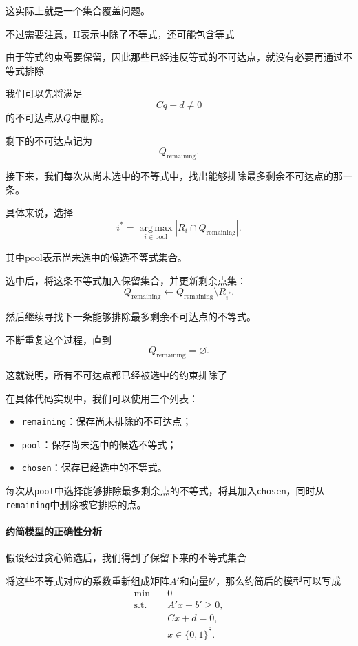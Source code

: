 这实际上就是一个集合覆盖问题。

不过需要注意，H表示中除了不等式，还可能包含等式

由于等式约束需要保留，因此那些已经违反等式的不可达点，就没有必要再通过不等式排除

我们可以先将满足
\[
Cq+d\ne0
\]
的不可达点从$Q$中删除。

剩下的不可达点记为
\[
Q_{\mathrm{remaining}}.
\]

接下来，我们每次从尚未选中的不等式中，找出能够排除最多剩余不可达点的那一条。

具体来说，选择
\[
i^*=\underset{i\in\mathrm{pool}}{\operatorname{arg\,max}}
\left|R_i\cap Q_{\mathrm{remaining}}\right|.
\]

其中$\mathrm{pool}$表示尚未选中的候选不等式集合。

选中后，将这条不等式加入保留集合，并更新剩余点集：
\[
Q_{\mathrm{remaining}}
\leftarrow
Q_{\mathrm{remaining}}\setminus R_{i^*}.
\]

然后继续寻找下一条能够排除最多剩余不可达点的不等式。

不断重复这个过程，直到
\[
Q_{\mathrm{remaining}}=\varnothing.
\]

这就说明，所有不可达点都已经被选中的约束排除了

在具体代码实现中，我们可以使用三个列表：

\begin{itemize}
    \item \texttt{remaining}：保存尚未排除的不可达点；
    \item \texttt{pool}：保存尚未选中的候选不等式；
    \item \texttt{chosen}：保存已经选中的不等式。
\end{itemize}

每次从\texttt{pool}中选择能够排除最多剩余点的不等式，将其加入\texttt{chosen}，同时从\texttt{remaining}中删除被它排除的点。

\paragraph{约简模型的正确性分析}

假设经过贪心筛选后，我们得到了保留下来的不等式集合

将这些不等式对应的系数重新组成矩阵$A'$和向量$b'$，那么约简后的模型可以写成
\begin{equation}
\begin{aligned}
\min\quad &0\\
\text{s.t.}\quad
&A'x+b'\ge0,\\
&Cx+d=0,\\
&x\in\{0,1\}^{8}.
\end{aligned}
\label{eq:lab4-reduced-hull-model}
\end{equation}

